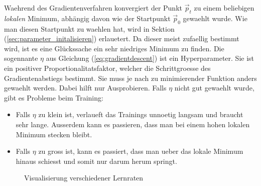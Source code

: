 Waehrend des Gradientenverfahren konvergiert der Punkt $\vec{p}_t$ zu einem
beliebigen \textit{lokalen} Minimum, abhängig davon wie der Startpunkt
$\vec{p}_0$ gewaehlt wurde.
Wie man diesen Startpunkt zu waehlen hat, wird in Sektion
(\ref{sec:parameter_initalisieren}) erlauetert.
Da dieser meist zufaellig bestimmt wird, ist es eine Glückssache ein sehr niedriges Minimum zu finden.
\para{}
Die sogennante  $\eta$ aus Gleichung (\ref{eq:gradientdescent}) ist ein Hyperparameter.
Sie ist ein positiver Proportionalitatsfaktor, welcher die Schrittgroesse des
Gradientenabstiegs bestimmt. Sie muss je nach zu minimierender Funktion anders gewaehlt werden.
Dabei hilft nur Ausprobieren. Falls $\eta$ nicht gut gewaehlt wurde, gibt es Probleme beim Training:
\begin{itemize}
\item{Falls $\eta$ zu klein ist, verlaueft das Trainings unnoetig langsam und braucht sehr lange.
    Ausserdem kann es passieren, dass man bei einem hohen lokalen Minimum stecken bleibt.}

\item{Falls $\eta$ zu gross ist, kann es passiert, dass man ueber das lokale
    Minimum hinaus schiesst und somit nur darum herum springt.}
\end{itemize}

\begin{figure}[h!]
  \centering
  \caption{Visualisierung verschiedener Lernraten}
\end{figure}

